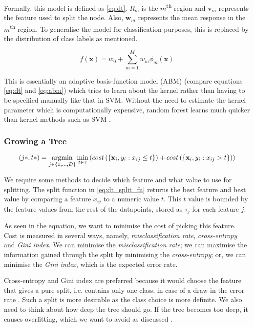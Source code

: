 Formally, this model is defined as \autoref{eq:dt}. $R_m$ is the $m$\textsuperscript{th} region and $\mathbf{v}_m$ represents the feature used to split the node. Also, $\mathbf{w}_m$ represents the mean response in the $m$\textsuperscript{th} region. To generalise the model for classification purposes, this is replaced by the distribution of class labels as mentioned.

\begin{equation} \label{eq:abm}
  f(\mathbf{x}) = w_0 + \sum_{m=1}^{M} w_m\phi_m(\mathbf{x})
\end{equation}

This is essentially an adaptive basis-function model (ABM) (compare equations \ref{eq:dt} and \ref{eq:abm}) which tries to learn about the kernel rather than having to be specified manually like that in SVM. Without the need to estimate the kernel parameter which is computationally expensive, random forest learns much quicker than kernel methods such as SVM \cite{mur-book}. 

\subsubsection{Growing a Tree}
\begin{equation} \label{eq:dt_split_fn}
  (j*, t*) = \operatornamewithlimits{argmin}_{j \in \{1, ...,D\}} \operatornamewithlimits{min}_{t \in \tau} 
  \left( 
    cost \left(\{\mathbf{x}_i, y_i : x_{ij} \leq t \}\right) +
    cost \left(\{\mathbf{x}_i, y_i : x_{ij} > t\}\right)
  \right)
\end{equation}

We require some methods to decide which feature and what value to use for splitting. The split function in \autoref{eq:dt_split_fn} returns the best feature and best value by comparing a feature $x_{ij}$ to a numeric value $t$. This $t$ value is bounded by the feature values from the rest of the datapoints, stored as $\tau_{j}$ for each feature $j$.

As seen in the equation, we want to minimise the cost of picking this feature. Cost is measured in several ways, namely, \textit{misclassification rate}, \textit{cross-entropy} and \textit{Gini index}. We can minimise the \textit{misclassification rate}; we can maximise the information gained through the split by minimising the \textit{cross-entropy}; or, we can minimise the \textit{Gini index}, which is the expected error rate. 

Cross-entropy and Gini index are preferred because it would choose the feature that gives a pure split, i.e. contains only one class, in case of a draw in the error rate \cite{mur-book}. Such a split is more desirable as the class choice is more definite. We also need to think about how deep the tree should go. If the tree becomes too deep, it causes overfitting, which we want to avoid as discussed \cite{mur-book}. 

